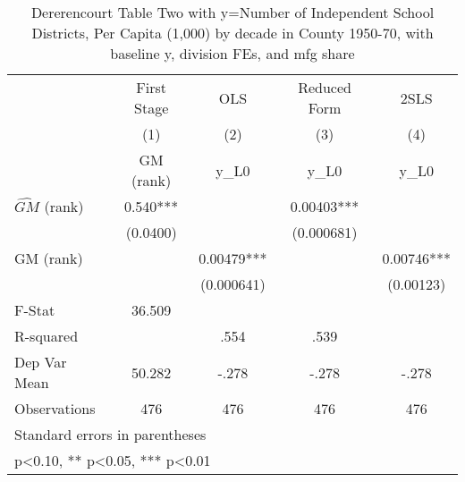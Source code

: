 \begin{table}[htbp]\centering
\def\sym#1{\ifmmode^{#1}\else\(^{#1}\)\fi}
\caption{Dererencourt Table Two with y=Number of Independent School Districts, Per Capita (1,000) by decade in County 1950-70, with baseline y, division FEs, and mfg share}
\begin{tabular}{l*{4}{c}}
\toprule
                    & First Stage   &         OLS   &Reduced Form   &        2SLS   \\
                    &\multicolumn{1}{c}{(1)}&\multicolumn{1}{c}{(2)}&\multicolumn{1}{c}{(3)}&\multicolumn{1}{c}{(4)}\\
                    &\multicolumn{1}{c}{GM  (rank)}&\multicolumn{1}{c}{y\_L0}&\multicolumn{1}{c}{y\_L0}&\multicolumn{1}{c}{y\_L0}\\
\midrule
$\hat{GM}$ (rank)   &       0.540***&               &     0.00403***&               \\
                    &    (0.0400)   &               &  (0.000681)   &               \\
\addlinespace
GM  (rank)          &               &     0.00479***&               &     0.00746***\\
                    &               &  (0.000641)   &               &   (0.00123)   \\
\midrule
F-Stat              &      36.509   &               &               &               \\
R-squared           &               &        .554   &        .539   &               \\
Dep Var Mean        &      50.282   &       -.278   &       -.278   &       -.278   \\
Observations        &         476   &         476   &         476   &         476   \\
\bottomrule
\multicolumn{5}{l}{\footnotesize Standard errors in parentheses}\\
\multicolumn{5}{l}{\footnotesize * p<0.10, ** p<0.05, *** p<0.01}\\
\end{tabular}
\end{table}
